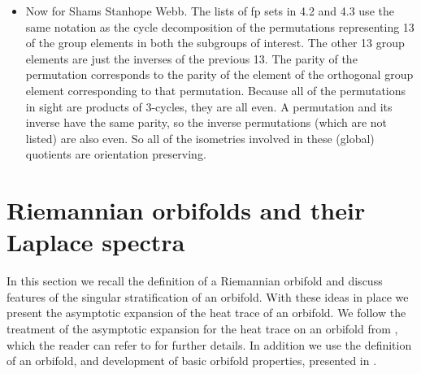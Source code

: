 \documentclass{amsart}
\theoremstyle{plain}
\theoremstyle{definition}
\theoremstyle{remark}
\begin{document}
\begin{itemize}
\item Now for Shams Stanhope Webb.  The lists of fp sets in 4.2 and 4.3 use the same notation as the cycle decomposition of the permutations representing 13 of the group elements in both the subgroups of interest.  The other 13 group elements are just the inverses of the previous 13.  The parity of the permutation corresponds to the parity of the element of the orthogonal group element corresponding to that permutation.  Because all of the permutations in sight are products of 3-cycles, they are all even. A permutation and its inverse have the same parity, so the inverse permutations (which are not listed) are also even. So all of the isometries involved in these (global) quotients are orientation preserving. 
\end{itemize}

\section{Riemannian orbifolds and their Laplace spectra}

In this section we recall the definition of a Riemannian orbifold and discuss features of the singular stratification of an orbifold.  With these ideas in place we present the asymptotic expansion of the heat trace of an orbifold. We follow the treatment of the asymptotic expansion for the heat trace on an orbifold from \cite{dggw}, which the reader can refer to for further details.  In addition we use the definition of an orbifold, and development of basic orbifold properties, presented in \cite{gordon12}.   
\end{document}

